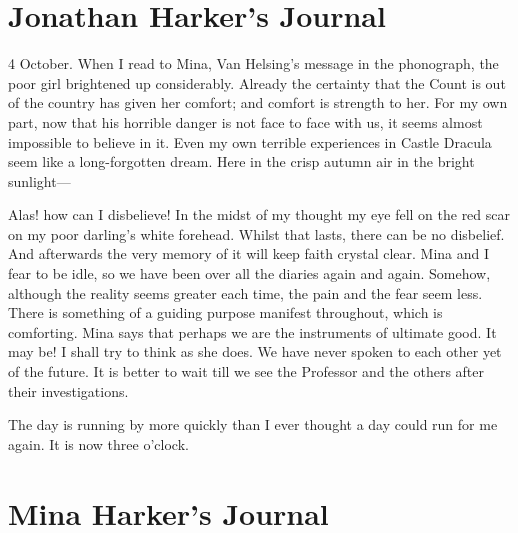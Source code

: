 \section{Jonathan Harker's Journal}

\begin{diary}{4 October.}
When I read to Mina, Van Helsing's message in the phonograph, the poor girl brightened up considerably. Already the certainty that the Count is out of the country has given her comfort; and comfort is strength to her. For my own part, now that his horrible danger is not face to face with us, it seems almost impossible to believe in it. Even my own terrible experiences in Castle Dracula seem like a long-forgotten dream. Here in the crisp autumn air in the bright sunlight—

Alas! how can I disbelieve! In the midst of my thought my eye fell on the red scar on my poor darling's white forehead. Whilst that lasts, there can be no disbelief. And afterwards the very memory of it will keep faith crystal clear. Mina and I fear to be idle, so we have been over all the diaries again and again. Somehow, although the reality seems greater each time, the pain and the fear seem less. There is something of a guiding purpose manifest throughout, which is comforting. Mina says that perhaps we are the instruments of ultimate good. It may be! I shall try to think as she does. We have never spoken to each other yet of the future. It is better to wait till we see the Professor and the others after their investigations.

The day is running by more quickly than I ever thought a day could run for me again. It is now three o'clock.
\end{diary}

\section{Mina Harker's Journal}

